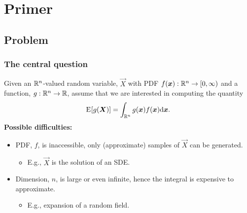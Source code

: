 {
\frame[noframenumbering]{\titlepage}
}
{
}

\section{Primer}
\subsection{Problem}
\begin{frame}\frametitle{The central question}
  Given an $\mathbb{R}^n$-valued random variable, $\vec X$ with PDF
  $f({{\boldsymbol x}}) : \mathbb{R}^n \to [0,\infty)$ and a function,
  $g : \mathbb{R}^n \to \mathbb{R}$, assume that we are interested in
  computing the quantity
\begin{equation*}\label{eq:expectation}
  {\ensuremath{\mathrm{E}}\mspace{-2mu}\left[g({\ensuremath{{\boldsymbol X}}})\right]} = \int_{\mathbb{R}^n} g({{\boldsymbol x}}) f({{\boldsymbol x}}) { \mathrm{d} }{{{\boldsymbol x}}}.
\end{equation*}
\pause
\vskip 0.5cm \textbf{Possible difficulties:}
\begin{itemize}
\item PDF, $f$, is inaccessible, only (approximate) samples of $\vec X$ can be generated.
\begin{itemize}
\item E.g., $\vec X$ is the solution of an SDE.
\end{itemize}
\item Dimension, $n$, is large or even infinite, hence the integral is expensive to approximate.
\begin{itemize}
\item E.g., expansion of a random field.
\end{itemize}
\end{itemize}
\end{frame}


